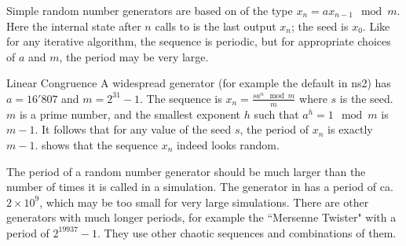 Simple random number generators are based on  of the type $ x_n = a x_{n-1} \mod m $. Here the
internal state after $n$ calls to  is the last output
$x_n$; the seed is $x_0$. Like for any iterative algorithm, the
sequence is periodic, but for appropriate choices of $a$ and
$m$, the period may be very large.


\begin{figure}
 \begin{center}
 \end{center}%
\end{figure}

\begin{ex}{Linear Congruence}
A widespread generator (for example the default in ns2) has
$a=16'807$ and $m=2^{31}-1$. The sequence is $x_n= \frac{s a^n
\mod m}{m}$ where $s$ is the seed. $m$ is a prime number, and
the smallest exponent $h$ such that $a^h=1 \mod m$ is $m-1$. It
follows that for any value of the seed $s$, the period of $x_n$
is exactly $m-1$.  shows that the sequence $x_n$
indeed looks random.
\end{ex}


The period of a random number generator should be much larger
than the number of times it is called in a simulation. The
generator in  has a period of ca. $2 \times
10^9$, which may be too small for very large simulations. There
are other generators with much longer periods, for example the
``Mersenne Twister" \cite{matsumoto1998mersenne} with a period
of $2^{19937}-1$. They use other chaotic sequences and
combinations of them.

